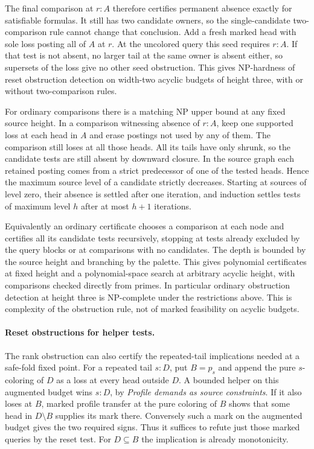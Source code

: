 The final comparison at $r:A$ therefore
certifies permanent absence exactly for
satisfiable formulas. It still has two
candidate owners, so the single-candidate
two-comparison rule cannot change that conclusion. Add a
fresh marked head with sole loss posting
all of $A$ at $r$. At the uncolored query
this seed requires $r:A$. If that test is
not absent, no larger tail at the same owner
is absent either, so supersets of the loss
give no other seed obstruction. This gives
NP-hardness of reset obstruction detection
on width-two acyclic budgets of height
three, with or without two-comparison rules.

For ordinary comparisons there is a matching
NP upper bound at any fixed source height.
In a comparison witnessing absence of $r:A$,
keep one supported loss at each head in $A$
and erase postings not used by any of them.
The comparison still loses at all those heads.
All its tails have only shrunk, so the candidate
tests are still absent by downward closure.
In the source graph each retained posting
comes from a strict predecessor of one of
the tested heads. Hence the maximum source
level of a candidate strictly decreases.
Starting at sources of level zero, their
absence is settled after one iteration,
and induction settles tests of maximum
level $h$ after at most $h+1$ iterations.

Equivalently an ordinary certificate chooses
a comparison at each node and certifies
all its candidate tests recursively, stopping
at tests already excluded by the query blocks
or at comparisons with no candidates.
The depth is bounded by the source height
and branching by the palette. This gives
polynomial certificates at fixed height
and a polynomial-space search at arbitrary
acyclic height, with comparisons checked
directly from primes. In particular ordinary
obstruction detection at height three is
NP-complete under the restrictions above.
This is complexity of the obstruction rule,
not of marked feasibility on acyclic budgets.

\paragraph{Reset obstructions for helper tests.}
The rank obstruction can also certify the
repeated-tail implications needed at a safe-fold
fixed point. For a repeated tail $s:D$, put
$B=p_s$ and append the pure $s$-coloring of $D$
as a loss at every head outside $D$. A bounded
helper on this augmented budget wins $s:D$,
by \emph{Profile demands as source constraints}.
If it also loses at $B$, marked profile transfer
at the pure coloring of $B$ shows that some
head in $D\setminus B$ supplies its mark there.
Conversely such a mark on the augmented budget
gives the two required signs. Thus it suffices
to refute just those marked queries by the reset
test. For $D\subseteq B$ the implication is
already monotonicity.

